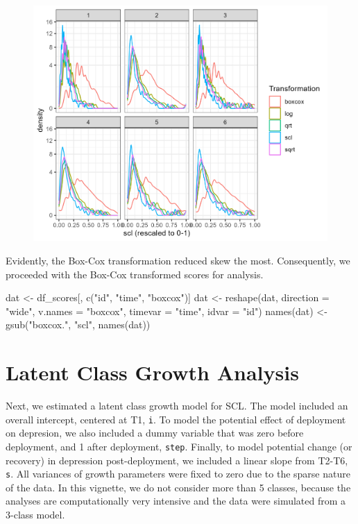 \documentclass[
  man,floatsintext]{apa6}
\newenvironment{Shaded}{\begin{snugshade}}{\end{snugshade}}
\newcommand{\AttributeTok}[1]{\textcolor[rgb]{0.77,0.63,0.00}{#1}}
\newcommand{\FunctionTok}[1]{\textcolor[rgb]{0.00,0.00,0.00}{#1}}
\newcommand{\NormalTok}[1]{#1}
\newcommand{\OtherTok}[1]{\textcolor[rgb]{0.56,0.35,0.01}{#1}}
\newcommand{\StringTok}[1]{\textcolor[rgb]{0.31,0.60,0.02}{#1}}
\begin{document}
\begin{figure}
\includegraphics[width=0.5\linewidth]{appendices/plot_trans} \caption{ }\label{fig:unnamed-chunk-9}
\end{figure}

Evidently, the Box-Cox transformation reduced skew the most.
Consequently, we proceeded with the Box-Cox transformed scores for analysis.

\begin{Shaded}
\begin{Highlighting}[]
\NormalTok{dat }\OtherTok{\textless{}{-}}\NormalTok{ df\_scores[, }\FunctionTok{c}\NormalTok{(}\StringTok{"id"}\NormalTok{, }\StringTok{"time"}\NormalTok{, }\StringTok{"boxcox"}\NormalTok{)]}
\NormalTok{dat }\OtherTok{\textless{}{-}} \FunctionTok{reshape}\NormalTok{(dat, }\AttributeTok{direction =} \StringTok{"wide"}\NormalTok{, }\AttributeTok{v.names =} \StringTok{"boxcox"}\NormalTok{, }\AttributeTok{timevar =} \StringTok{"time"}\NormalTok{,}
    \AttributeTok{idvar =} \StringTok{"id"}\NormalTok{)}
\FunctionTok{names}\NormalTok{(dat) }\OtherTok{\textless{}{-}} \FunctionTok{gsub}\NormalTok{(}\StringTok{"boxcox."}\NormalTok{, }\StringTok{"scl"}\NormalTok{, }\FunctionTok{names}\NormalTok{(dat))}
\end{Highlighting}
\end{Shaded}

\hypertarget{latent-class-growth-analysis}{%
\section{Latent Class Growth Analysis}\label{latent-class-growth-analysis}}

Next, we estimated a latent class growth model
for SCL.
The model included an overall intercept, centered at T1, \texttt{i}.
To model the potential effect of deployment on
depresion,
we also included a dummy variable that was zero before
deployment, and 1 after deployment, \texttt{step}.
Finally, to model potential change (or recovery) in depression post-deployment,
we included a linear slope from T2-T6, \texttt{s}.
All variances of growth parameters were fixed to zero due to the sparse nature of the data.
In this vignette,
we do not consider more than 5 classes,
because the analyses are computationally very intensive and the data were simulated from a 3-class model.
\end{document}
